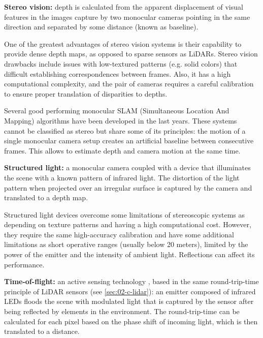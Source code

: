 
\textbf{Stereo vision:} depth is calculated \cite{Hamzah2016} from the 
apparent displacement of visual features in the images capture by two 
monocular cameras pointing in the same direction and separated by some
distance (known as baseline). 
            
One of the greatest advantages of stereo vision systems is their capability 
to provide dense depth maps, as opposed to sparse sensors as LiDARs. 
Stereo vision drawbacks include issues with low-textured patterns 
(e.g. solid colors) that difficult establishing correspondences between
frames. Also, it has a high computational complexity, and the pair of 
cameras requires a careful calibration to ensure proper translation of 
disparities to depths.

Several good performing monocular SLAM (Simultaneous Location And Mapping)
algorithms \cite{Engel2014}\cite{Engel2018} have been developed in the last
years. 
These systems cannot be classified as stereo but share some of its principles: 
the motion of a single monocular camera setup creates an artificial baseline
between consecutive frames. This allows to estimate depth and camera motion at
the same time.
    
\textbf{Structured light:} a monocular camera coupled with a device that
illuminates the scene with a known pattern of infrared light. 
The distortion of the light pattern when projected over an irregular 
surface is captured by the camera and translated to a depth map.

Structured light devices overcome some limitations of stereoscopic systems
as depending on texture patterns and having a high computational cost. 
However, they require the same high-accuracy calibration \cite{Garbat2013}
and have some additional limitations as short operative ranges (usually 
below 20 meters), limited by the power of the emitter and the intensity of 
ambient light. Reflections can affect its performance.


\textbf{Time-of-flight:} an active sensing technology 
\cite{Hansard2013}, based in the same round-trip-time principle 
of LiDAR sensors (see \ref{sec:02-c-lidar}): an emitter composed of infrared 
LEDs floods the scene
with modulated light that is captured by the sensor after being reflected by 
elements in the environment. 
The round-trip-time can be calculated for each pixel based on the phase shift 
of incoming light, which is then translated to a distance.

